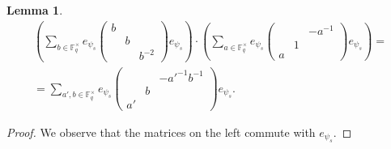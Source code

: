 \documentclass[12pt,reqno]{amsart}
\newtheorem{lem}[thm]{Lemma}
\theoremstyle{definition}
\theoremstyle{remark}
\numberwithin{equation}{section}
\begin{document}
\begin{lem}\label{B_2}
    \begin{multline*}
        \left(\sum_{b \in \mathbb{F}_q^\times}e_{\psi_s} \begin{pmatrix}
            b & &\\
            & b &\\
            & & b^{-2}
        \end{pmatrix} e_{\psi_s} \right)\cdot \left(\sum_{a \in \mathbb{F}_q^\times} e_{\psi_s} \begin{pmatrix}
            & & -a^{-1}\\
            & 1 &\\
            a & &
        \end{pmatrix}e_{\psi_s}\right) =\\= \sum_{a', b \in \mathbb{F}_q^\times} e_{\psi_s} \begin{pmatrix}
            & & -a'^{-1}b^{-1}\\
            & b &\\
            a' & &
        \end{pmatrix} e_{\psi_s}.
    \end{multline*}
\end{lem}

\begin{proof}
    We observe that the matrices on the left commute with $e_{\psi_s}$.
\end{proof}
\end{document}
